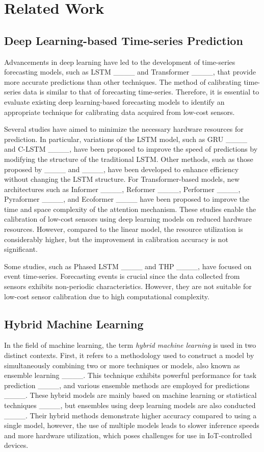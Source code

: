 \section{Related Work\label{sec_related}
}
\subsection{Deep Learning-based Time-series Prediction}
Advancements in deep learning have led to the development of time-series forecasting models, such as LSTM ____ and Transformer ____, that provide more accurate predictions than other techniques. The method of calibrating time-series data is similar to that of forecasting time-series. Therefore, it is essential to evaluate existing deep learning-based forecasting models to identify an appropriate technique for calibrating data acquired from low-cost sensors.


Several studies have aimed to minimize the necessary hardware resources for prediction. In particular, variations of the LSTM model, such as GRU ____ and C-LSTM ____, have been proposed to improve the speed of predictions by modifying the structure of the traditional LSTM. Other methods, such as those proposed by ____ and ____, have been developed to enhance efficiency without changing the LSTM structure. For Transformer-based models, new architectures such as Informer ____, Reformer ____, Performer ____, Pyraformer ____, and Ecoformer ____ have been proposed to improve the time and space complexity of the attention mechanism. These studies enable the calibration of low-cost sensors using deep learning models on reduced hardware resources. However, compared to the linear model, the resource utilization is considerably higher, but the improvement in calibration accuracy is not significant.

Some studies, such as Phased LSTM ____ and THP ____, have focused on event time-series. Forecasting events is crucial since the data collected from sensors exhibits non-periodic characteristics. However, they are not suitable for low-cost sensor calibration due to high computational complexity.

\subsection{Hybrid Machine Learning}
In the field of machine learning, the term \textit{hybrid machine learning} is used in two distinct contexts. First, it refers to a methodology used to construct a model by simultaneously combining two or more techniques or models, also known as ensemble learning ____. This technique exhibits powerful performance for task prediction ____, and various ensemble methods are employed for predictions ____. These hybrid models are mainly based on machine learning or statistical techniques ____, but ensembles using deep learning models are also conducted ____. Their hybrid methods demonstrate higher accuracy compared to using a single model, however, the use of multiple models leads to slower inference speeds and more hardware utilization, which poses challenges for use in IoT-controlled devices.

